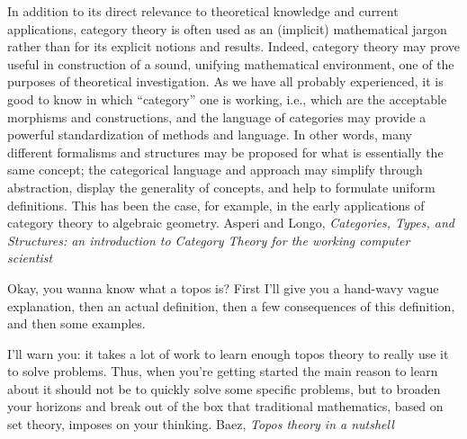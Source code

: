 \documentclass[11pt,openany]{book}
\begin{document}
\begin{boxquote}
In addition to its direct relevance to theoretical knowledge and current applications, category theory
is often used as an (implicit) mathematical jargon rather than for its explicit notions and results.
Indeed, category theory may prove useful in construction of a sound, unifying mathematical
environment, one of the purposes of theoretical investigation. As we have all probably experienced, it
is good to know in which ``category'' one is working, i.e., which are the acceptable morphisms and
constructions, and the language of categories may provide a powerful standardization of methods and
language. In other words, many different formalisms and structures may be proposed for what is
essentially the same concept; the categorical language and approach may simplify through abstraction,
display the generality of concepts, and help to formulate uniform definitions. This has been the case,
for example, in the early applications of category theory to algebraic geometry.
\tcblower
{Asperi and Longo, \textit{Categories, Types, and Structures: 
an introduction to Category Theory for the working computer scientist}~\cite{asperti_longo_1991}}
\end{boxquote}

\begin{boxquote}
Okay, you wanna know what a topos is? 
First I'll give you a hand-wavy vague explanation, 
then an actual definition, 
then a few consequences of this definition, 
and then some examples.
\par
I'll warn you: 
it takes a lot of work to learn enough topos theory 
to really use it to solve problems. 
Thus, when you're getting started the main reason to learn 
about it should not be to quickly solve some specific problems, 
but to broaden your horizons and break out of the box 
that traditional mathematics, based on set theory, 
imposes on your thinking.
\tcblower
{Baez, \textit{Topos theory in a 
nutshell}~\cite{baez_2017_topos_nutshell}}
\end{boxquote}
\end{document}
